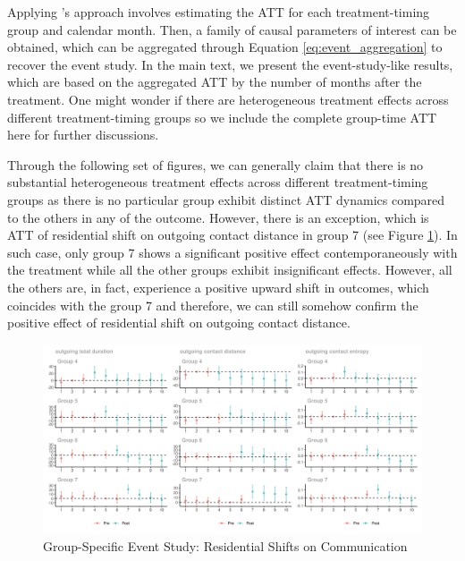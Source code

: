 
\label{complete_group_time_att_dynamics}
Applying \cite{callaway2021difference}'s approach involves estimating the ATT for each treatment-timing group and calendar month. Then, a family of causal parameters of interest can be obtained, which can be aggregated through Equation \ref{eq:event_aggregation} to recover the event study. In the main text, we present the event-study-like results, which are based on the aggregated ATT by the number of months after the treatment. One might wonder if there are heterogeneous treatment effects across different treatment-timing groups so we include the complete group-time ATT here for further discussions.

Through the following set of figures, we can generally claim that there is no substantial heterogeneous treatment effects across different treatment-timing groups as there is no particular group exhibit distinct ATT dynamics compared to the others in any of the outcome. However, there is an exception, which is ATT of residential shift on outgoing contact distance in group 7 (see Figure \ref{fig:attgt_residential_shift_mobile_communication_network}). In such case, only group 7 shows a significant positive effect contemporaneously with the treatment while all the other groups exhibit insignificant effects. However, all the others are, in fact, experience a positive upward shift in outcomes, which coincides with the group 7 and therefore, we can still somehow confirm the positive effect of residential shift on outgoing contact distance.

\clearpage\newpage
\begin{figure}[ht!]
\centering
\caption{Group-Specific Event Study: Residential Shifts on Communication}


\includegraphics[width=1.5\textwidth, angle=90]{figures/csdid/cohort_specific_ATT_dynamics/residential_shift_mobile_communication_network.png}

\label{fig:attgt_residential_shift_mobile_communication_network}
\end{figure}


